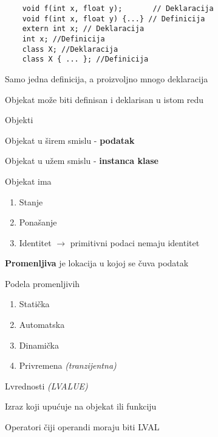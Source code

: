 \documentclass{article}
\newenvironment{xitemize}{%
    
    \itemize
    \larger
}{%
    \enditemize
}
\let\olditemize\itemize
\let\endolditemize\enditemize
\renewenvironment{itemize}{%
    \smaller
    \olditemize
}{%
    \endolditemize
}
\begin{document}
\begin{xitemize}
\begin{multicols}{2}
\begin{itemize}
    
    \end{itemize}
    \columnbreak
    \begin{lstlisting}
    void f(int x, float y);       // Deklaracija
    void f(int x, float y) {...} // Definicija
    extern int x; // Deklaracija
    int x; //Definicija
    class X; //Deklaracija
    class X { ... }; //Definicija
    \end{lstlisting}
    \end{multicols}
    \begin{itemize}
        \item Samo jedna definicija, a proizvoljno mnogo deklaracija
        \item Objekat može biti definisan i deklarisan u istom redu
    \end{itemize}
    \item Objekti
    \begin{itemize}
        \item Objekat u širem smislu - \textbf{podatak}
        \item Objekat u užem smislu - \textbf{instanca klase}
        \item Objekat ima 
        \begin{enumerate}
            \item Stanje
            \item Ponašanje
            \item Identitet $\rightarrow$ primitivni podaci nemaju identitet
        \end{enumerate}
        \item \textbf{Promenljiva} je lokacija u kojoj se čuva podatak
        \item Podela promenljivih
        \begin{enumerate}
            \item Statička
            \item Automatska
            \item Dinamička
            \item Privremena \textit{(tranzijentna)}
        \end{enumerate}
    \end{itemize}
    \begin{multicols}{2}
    \item Lvrednosti \textit{(LVALUE)}
    \begin{itemize}
        \item Izraz koji upućuje na objekat ili funkciju
        \item Operatori čiji operandi moraju biti LVAL \\

\end{itemize}
\end{multicols}
\end{xitemize}
\end{document}
